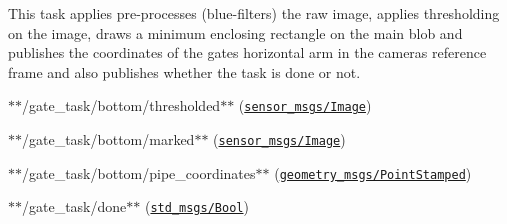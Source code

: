 This task applies pre-\/processes (blue-\/filters) the raw image, applies thresholding on the image, draws a minimum enclosing rectangle on the main blob and publishes the coordinates of the gate\textquotesingle{}s horizontal arm in the camera\textquotesingle{}s reference frame and also publishes whether the task is done or not.


\begin{DoxyItemize}
\item $\ast$$\ast${\ttfamily /gate\+\_\+task/bottom/thresholded}$\ast$$\ast$ (\href{http://docs.ros.org/api/sensor_msgs/html/msg/Image.html}{\tt sensor\+\_\+msgs/\+Image})
\item $\ast$$\ast${\ttfamily /gate\+\_\+task/bottom/marked}$\ast$$\ast$ (\href{http://docs.ros.org/api/sensor_msgs/html/msg/Image.html}{\tt sensor\+\_\+msgs/\+Image})
\item $\ast$$\ast${\ttfamily /gate\+\_\+task/bottom/pipe\+\_\+coordinates}$\ast$$\ast$ (\href{http://docs.ros.org/kinetic/api/geometry_msgs/html/msg/PointStamped.html}{\tt geometry\+\_\+msgs/\+Point\+Stamped})
\item $\ast$$\ast${\ttfamily /gate\+\_\+task/done}$\ast$$\ast$ (\href{http://docs.ros.org/kinetic/api/std_msgs/html/msg/Bool.html}{\tt std\+\_\+msgs/\+Bool})
\end{DoxyItemize}


